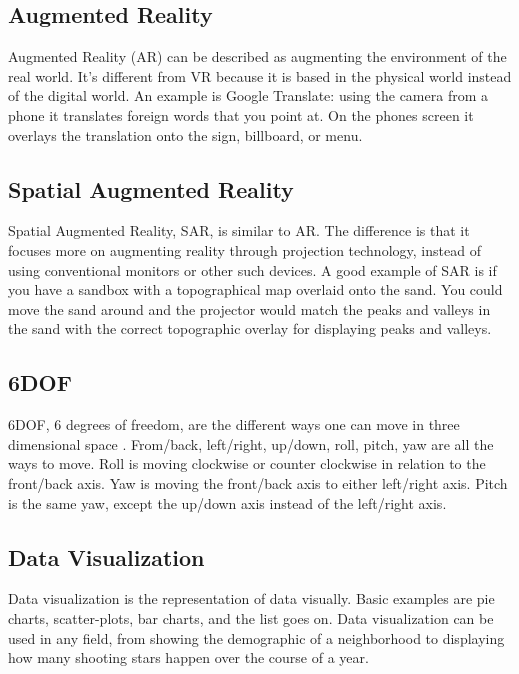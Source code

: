 \documentclass{sig-alternate}
\begin{document}
\subsection{Augmented Reality}
\label{sec:Augmented Reality}
Augmented Reality (AR) can be described as augmenting the environment of the real world. It's different from VR because it is based in the physical world instead of the digital world. An example is Google Translate: using the camera from a phone it translates foreign words that you point at. On the phones screen it overlays the translation onto the sign, billboard, or menu. 


\subsection{Spatial Augmented Reality}
\label{sec:Spatial Augmented Reality}
Spatial Augmented Reality, SAR, is similar to AR. The difference is that it focuses more on augmenting reality through projection technology, instead of using conventional monitors or other such devices. A good example of SAR is if you have a sandbox with a topographical map overlaid onto the sand. You could move the sand around and the projector would match the peaks and valleys in the sand with the correct topographic overlay for displaying peaks and valleys.  

\subsection{6DOF}
\label{sec:6DOF}
6DOF, 6 degrees of freedom, are the different ways one can move in three dimensional space . From/back, left/right, up/down, roll, pitch, yaw are all the ways to move. Roll is moving clockwise or counter clockwise in relation to the front/back axis. Yaw is moving the front/back axis to either left/right axis. Pitch is the same yaw, except the up/down axis instead of the left/right axis.

\subsection{Data Visualization}
\label{sec:Data Visualization}
Data visualization is the representation of data visually. Basic examples are pie charts, scatter-plots, bar charts, and the list goes on. Data visualization can be used in any field, from showing the demographic of a neighborhood to displaying how many shooting stars happen over the course of a year.   
\end{document}
